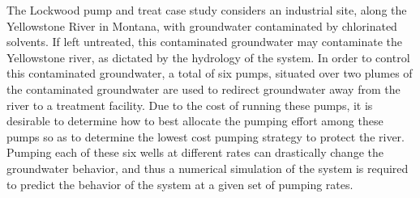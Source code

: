 \documentclass{article}
\begin{document}
%
%

The Lockwood pump and treat case study considers an industrial site, along the 
Yellowstone River in Montana, with groundwater contaminated by chlorinated 
solvents. If left untreated, this contaminated groundwater may contaminate the 
Yellowstone river, as dictated by the hydrology of the system. In order to 
control this contaminated groundwater, a total of six pumps, situated over two 
plumes of the contaminated groundwater are used to redirect groundwater away 
from the river to a treatment facility. Due to the cost of running these pumps, 
it is desirable to determine how to best allocate the pumping effort among 
these pumps so as to determine the lowest cost pumping strategy to protect the 
river. Pumping each of these six wells at different rates can drastically 
change the groundwater behavior, and  thus a numerical simulation of the 
system is required to predict the behavior of the system at a given set of 
pumping rates.
 
%
%

%
%
\end{document}
